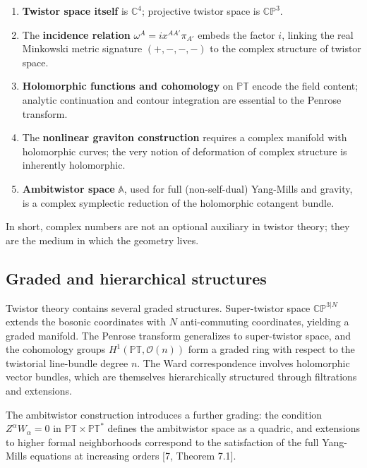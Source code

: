 \documentclass[12pt]{article}
\providecommand{\tightlist}{%
  \setlength{\itemsep}{0pt}\setlength{\parskip}{0pt}}
\begin{document}
\begin{enumerate}
\def\labelenumi{\arabic{enumi}.}
\tightlist
\item
  \textbf{Twistor space itself} is \(\mathbb{C}^4\); projective twistor
  space is \(\mathbb{CP}^3\).
\item
  The \textbf{incidence relation} \(\omega^A = i x^{AA'} \pi_{A'}\)
  embeds the factor \(i\), linking the real Minkowski metric signature
  \((+,-,-,-)\) to the complex structure of twistor space.
\item
  \textbf{Holomorphic functions and cohomology} on \(\mathbb{PT}\)
  encode the field content; analytic continuation and contour
  integration are essential to the Penrose transform.
\item
  The \textbf{nonlinear graviton construction} requires a complex
  manifold with holomorphic curves; the very notion of deformation of
  complex structure is inherently holomorphic.
\item
  \textbf{Ambitwistor space} \(\mathbb{A}\), used for full
  (non-self-dual) Yang-Mills and gravity, is a complex symplectic
  reduction of the holomorphic cotangent bundle.
\end{enumerate}

In short, complex numbers are not an optional auxiliary in twistor
theory; they are the medium in which the geometry lives.

\subsection{Graded and hierarchical structures}\label{graded-and-hierarchical-structures}

Twistor theory contains several graded structures. Super-twistor space
\(\mathbb{CP}^{3|N}\) extends the bosonic coordinates with \(N\)
anti-commuting coordinates, yielding a graded manifold. The Penrose
transform generalizes to super-twistor space, and the cohomology groups
\(H^1(\mathbb{PT}, \mathcal{O}(n))\) form a graded ring with respect to
the twistorial line-bundle degree \(n\). The Ward correspondence
involves holomorphic vector bundles, which are themselves hierarchically
structured through filtrations and extensions.

The ambitwistor construction introduces a further grading: the condition
\(Z^\alpha W_\alpha = 0\) in \(\mathbb{PT} \times \mathbb{PT}^*\)
defines the ambitwistor space as a quadric, and extensions to higher
formal neighborhoods correspond to the satisfaction of the full
Yang-Mills equations at increasing orders {[}7, Theorem 7.1{]}.
\end{document}
